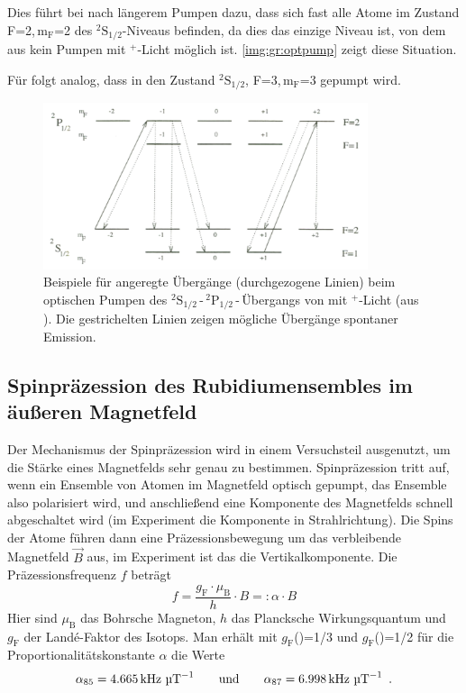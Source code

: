 Dies führt bei  nach längerem Pumpen dazu, dass sich fast alle Atome im Zustand
F=2,\,$\text{m}_\text{F}$=2 des \mbox{${}^2\text{S}_{1/2}$-Niveaus} befinden,
da dies das einzige Niveau ist, von dem aus kein Pumpen mit \textsigma$^+$-Licht möglich ist.
\autoref{img:gr:optpump} zeigt diese Situation.

Für  folgt analog, dass in den Zustand ${}^2\text{S}_{1/2}$, F=3,\,$\text{m}_\text{F}$=3 gepumpt wird. 


\begin{figure}[H]
\begin{center}
  \includegraphics[width=0.85\textwidth]{../img/optPumpen.png}
  \caption{Beispiele für angeregte Übergänge (durchgezogene Linien) beim optischen Pumpen des ${}^2\text{S}_{1/2}$\,-\,${}^2\text{P}_{1/2}$\,-\,Übergangs
  von  mit \textsigma$^+$-Licht (aus \cite{staatsex}).
  Die gestrichelten Linien zeigen mögliche Übergänge spontaner Emission.}
  \label{img:gr:optpump}
\end{center}
\end{figure} 

\subsection{Spinpräzession des Rubidiumensembles im äußeren Magnetfeld}
Der Mechanismus der Spinpräzession wird in einem Versuchsteil ausgenutzt,
um die Stärke eines Magnetfelds sehr genau zu bestimmen.
Spinpräzession tritt auf, wenn ein Ensemble von Atomen im Magnetfeld optisch gepumpt,
das Ensemble also polarisiert wird, und anschließend eine Komponente
des Magnetfelds schnell abgeschaltet wird (im Experiment die Komponente in Strahlrichtung).
Die Spins der Atome führen dann eine Präzessionsbewegung um das verbleibende Magnetfeld $\vec{B}$ aus,
im Experiment ist das die Vertikalkomponente.  %
Die Präzessionsfrequenz $f$ beträgt \cite{staatsex}
\begin{equation}
    \label{eq:gr:spinpräz}
    f=\frac{g_\text{F} \cdot \mu_\text{B}}{h} \cdot B=: \alpha \cdot B
\end{equation}
Hier sind $\mu_\text{B}$ das Bohrsche Magneton, $h$ das Plancksche Wirkungsquantum und
$g_\text{F}$ der Landé-Faktor des Isotops.
Man erhält mit $g_\text{F}$()=1/3 und $g_\text{F}$()=1/2 \cite{staatsex} für
die Proportionalitätskonstante $\alpha$ die Werte
\begin{equation}
    \label{eq:gr:alpha}
    \alpha_{85}=4.665\,\text{kHz } \text{\textmu T}^{-1} \qquad \text{und} \qquad	\alpha_{87}=6.998\,\text{kHz } \text{\textmu T}^{-1} \ \, .
\end{equation}

